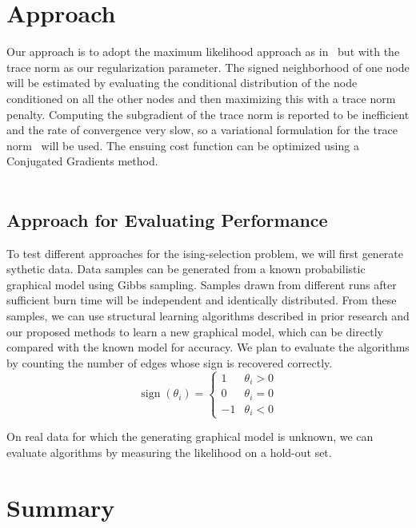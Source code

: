 \documentclass[11pt]{article}
\begin{document}
\section{Approach}
Our approach is to adopt the maximum likelihood approach as in~\cite{ravikumar2010high} but with the trace norm as our regularization parameter. The signed neighborhood of one node will be estimated by evaluating the conditional distribution of the node conditioned on all the other nodes and then maximizing this with a trace norm penalty. Computing the subgradient of the trace norm is reported to be inefficient and the rate of convergence very slow, so a variational formulation for the trace norm~\cite{grave2011trace} will be used. The ensuing cost function can be optimized using a Conjugated Gradients method. \\ \\ 
 
\subsection{Approach for Evaluating Performance}
To test different approaches for the ising-selection problem, we will first generate sythetic data. Data samples can be generated from a known probabilistic graphical model using Gibbs sampling. Samples drawn from different runs after sufficient burn time will be independent and identically distributed.  From these samples, we can use structural learning algorithms described in prior research and our proposed methods to learn a new graphical model, which can be directly compared with the known model for accuracy. We plan to evaluate the algorithms by counting the number of edges whose sign is recovered correctly.
$$\operatorname{sign}(\theta_i) = \begin{cases} 1 & \theta_i > 0\\ 0 & \theta_i = 0 \\ -1 & \theta_i < 0 \end{cases}$$

On real data for which the generating graphical model is unknown, we can evaluate algorithms by measuring the likelihood on a hold-out set.
\section{Summary}

{}

\end{document}
